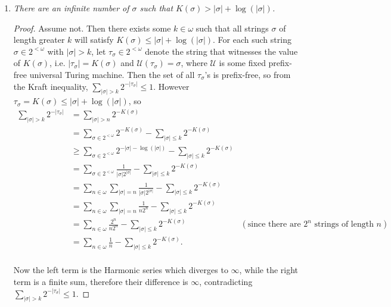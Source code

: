 \documentclass{article}
\begin{document}
\begin{enumerate}
    \begin{proof}
    \end{proof}

  \item \it There are an infinite number of $\sigma$ such that
    $K(\sigma)>|\sigma|+\log(|\sigma|)$.

    \begin{proof}
      Assume not. Then there exists some $k\in\omega$ such that all strings
      $\sigma$ of length greater $k$ will satisfy
      $K(\sigma)\leq|\sigma|+\log(|\sigma|)$. For each such string
      $\sigma\in 2^{<\omega}$ with $|\sigma|>k$, let
      $\tau_\sigma\in2^{<\omega}$ denote the string that witnesses the
      value of $K(\sigma)$, i.e.
      $|\tau_\sigma|=K(\sigma)$ and $\mathcal{U}(\tau_\sigma)=\sigma$, where
      $\mathcal{U}$ is some fixed prefix-free universal Turing machine.
      Then the set of all $\tau_\sigma$'s is prefix-free, so from
      the Kraft inequality, $\sum_{|\sigma|>k} 2^{-|\tau_\sigma|} \leq 1$.
      However $\tau_\sigma=K(\sigma) \leq |\sigma|+\log(|\sigma|)$, so
      \begin{align*}
        \sum_{|\sigma|>k} 2^{-|\tau_\sigma|} &=\sum_{|\sigma|>n}
          2^{-K(\sigma)} \\
        &=\sum_{\sigma\in 2^{<\omega}} 2^{-K(\sigma)} -\sum_{|\sigma|\leq
          k} 2^{-K(\sigma)} \\
        &\geq \sum_{\sigma\in 2^{<\omega}} 2^{-|\sigma|-\log(|\sigma|)}
          -\sum_{|\sigma|\leq k} 2^{-K(\sigma)}\\
        &=\sum_{\sigma\in 2^{<\omega}} \frac{1}{|\sigma|2^{|\sigma|}}
          -\sum_{|\sigma|\leq k} 2^{-K(\sigma)}\\
        &=\sum_{n\in\omega} \sum_{|\sigma|=n}
          \frac{1}{|\sigma|2^{|\sigma|}} -\sum_{|\sigma|\leq k}
          2^{-K(\sigma)}\\
        &=\sum_{n\in\omega} \sum_{|\sigma|=n}
          \frac{1}{n2^{n}} -\sum_{|\sigma|\leq k} 2^{-K(\sigma)}\\
        &=\sum_{n\in\omega}
          \frac{2^n}{n2^{n}} -\sum_{|\sigma|\leq k} 2^{-K(\sigma)}
          &(\text{since there are $2^n$ strings of length $n$})\\
        &=\sum_{n\in\omega} \frac{1}{n} -\sum_{|\sigma|\leq k}
          2^{-K(\sigma)}.\\
      \end{align*}

      Now the left term is the Harmonic series which diverges to $\infty$,
      while the right term is a finite sum, therefore their difference is
      $\infty$, contradicting $\sum_{|\sigma|>k} 2^{-|\tau_\sigma|} \leq
      1$.
    \end{proof}


\end{enumerate}
\end{document}
